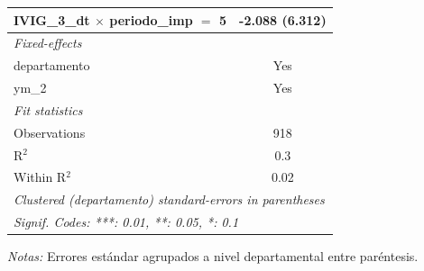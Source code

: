 \documentclass[12pt]{article}
\begin{document}
\begin{table}[htbp]
\begin{threeparttable}
\begin{tabular}{lc}
      IVIG\_3\_dt $\times$ periodo\_imp $=$ 5       & -2.088 (6.312)\\   
      \midrule
      \emph{Fixed-effects}\\
      departamento                                  & Yes\\  
      ym\_2                                         & Yes\\  
      \midrule
      \emph{Fit statistics}\\
      Observations                                  & 918\\  
      R$^2$                                         & 0.3\\  
      Within R$^2$                                  & 0.02\\  
      \midrule \midrule
      \multicolumn{2}{l}{\emph{Clustered (departamento) standard-errors in parentheses}}\\
      \multicolumn{2}{l}{\emph{Signif. Codes: ***: 0.01, **: 0.05, *: 0.1}}\\
   \end{tabular}


\begin{tablenotes}
\footnotesize
\item \textit{Notas:} Errores estándar agrupados a nivel departamental entre paréntesis.
\end{tablenotes}
\end{threeparttable}
\end{table}
\end{document}
